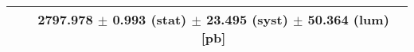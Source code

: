 \begin{tabular}{lc}
\hline
                               & 2797.978 $\pm$ 0.993 (stat) $\pm$ 23.495 (syst) $\pm$ 50.364 (lum) [pb]  \\
\hline
\end{tabular}
